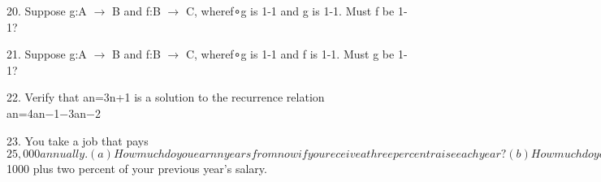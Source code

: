 \documentclass{article}
\begin{document}
20. Suppose g:A $\to$ B and f:B $\to$ C, wheref∘g is 1-1 and g is 1-1. Must f be 1-1?

21. Suppose g:A $\to$ B and f:B $\to$ C, wheref∘g is 1-1 and f is 1-1. Must g be 1-1?

22. Verify that an=3n+1 is a solution to the recurrence relation an=4an−1−3an−2

23. You take a job that pays $25,000 annually. 

(a) How much do you earn n years from now if you receive a three percent raise each year? 

(b) How much do you earn n years from now if you receive a five percent raise each year? 

(c) How much do you earn n years from now if each year you receive a raise of $1000 plus two percent of your previous year’s salary.
\end{document}
